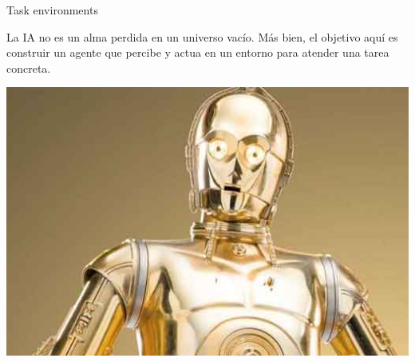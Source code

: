 \documentclass[11pt]{beamer}
\begin{document}
\begin{frame}{Task environments}

\begin{minipage}{.5\linewidth}

La IA no es un alma perdida en un universo vacío. Más bien, el objetivo aquí es construir un agente que percibe y actua en un entorno para atender una tarea concreta.

\end{minipage}\hspace{.1\linewidth}\begin{minipage}{.4\linewidth}

\includegraphics[scale=.2]{imagenes/c3po.jpg}

\end{minipage}

\end{frame}
\end{document}
